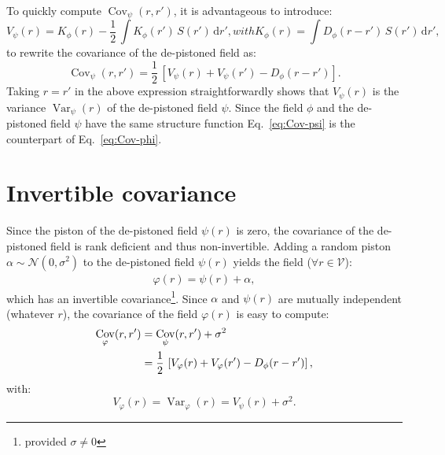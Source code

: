 \documentclass{article}
\DeclareMathOperator{\Var}{Var}
\DeclareMathOperator{\Cov}{Cov}
\begin{document}
To quickly compute $\Cov_{\psi}(r,r')$, it is advantageous to introduce:
\begin{subequations}
  \begin{equation}
    \label{eq:C-phi}
    V_{\psi}(r) = K_{\phi}(r)
    - \frac{1}{2}\,\int K_{\phi}(r')\,S(r')\,\mathrm{d}r',
  \end{equation}
  with
  \begin{equation}
    \label{eq:K-phi}
    K_{\phi}(r) = \int D_{\phi}(r - r')\,S(r')\,\mathrm{d}r',
  \end{equation}
\end{subequations}
to rewrite the covariance of the de-pistoned field as:
\begin{equation}
  \boxed{
    \Cov_{\psi}(r,r')
    = \frac{1}{2}\,\left[
      V_{\psi}(r) + V_{\psi}(r') - D_{\phi}(r - r')
    \right].
  }
  \label{eq:Cov-psi}
\end{equation}
Taking $r = r'$ in the above expression straightforwardly shows that
$V_{\psi}(r)$ is the variance $\Var_{\psi}(r)$ of the de-pistoned field $\psi$.
Since the field $\phi$ and the de-pistoned field $\psi$ have the same structure
function Eq.~\eqref{eq:Cov-psi} is the counterpart of Eq.~\eqref{eq:Cov-phi}.


\section{Invertible covariance}

Since the piston of the de-pistoned field $\psi(r)$ is zero, the covariance of
the de-pistoned field is rank deficient and thus non-invertible. Adding a
random piston $\alpha \sim \mathcal{N}(0,\sigma^{2})$ to the de-pistoned field
$\psi(r)$ yields the field ($\forall r \in \mathcal{V}$):
\begin{align}
  \label{eq:varphi-def}
  \varphi(r) = \psi(r) + \alpha,
\end{align}
which has an invertible covariance\footnote{provided $\sigma \not= 0$}. Since
$\alpha$ and $\psi(r)$ are mutually independent (whatever $r$), the covariance
of the field $\varphi(r)$ is easy to compute:
\begin{align}
  \Cov_{\varphi}(r,r')
  &= \Cov_{\psi}(r,r') + \sigma^{2} \notag\\
  &= \frac{1}{2}\,\left[
      V_{\varphi}(r) + V_{\varphi}(r') - D_{\phi}(r - r')
    \right],
  \label{eq:Cov-varphi}
\end{align}
with:
\begin{equation}
  \label{eq:Var-varphi}
  V_{\varphi}(r) = \Var_{\varphi}(r) = V_{\psi}(r) + \sigma^{2}.
\end{equation}
\end{document}
